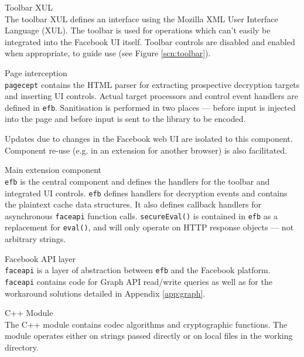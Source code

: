     \begin{sdesc}
     
    \item[Toolbar XUL] \hfill \\ The toolbar XUL defines an interface using the Mozilla XML User Interface Language (XUL). The toolbar is used for operations which can't easily be integrated into the Facebook UI itself. Toolbar controls are disabled and enabled when appropriate, to guide use (see Figure \ref{scn:toolbar}).
    
    \item[Page interception] \hfill \\ {\tt pagecept} contains the HTML parser for extracting prospective decryption targets and inserting UI controls. Actual target processors and control event handlers are defined in {\tt efb}. Sanitisation is performed in two places --- before input is injected into the page and before input is sent to the library to be encoded.
    
    Updates due to changes in the Facebook web UI are isolated to this component. Component re-use (e.g. in an extension for another browser) is also facilitated. 

    \item[Main extension component] \hfill \\ {\tt efb} is the central component and defines the handlers for the toolbar and integrated UI controls. {\tt efb} defines handlers for decryption events and contains the plaintext cache data structures. It also defines callback handlers for asynchronous {\tt faceapi} function calls. {\tt secureEval()} is contained in {\tt efb} as a replacement for {\tt eval()}, and will only operate on HTTP response objects --- not arbitrary strings.
    
    \item[Facebook API layer] \hfill \\ {\tt faceapi} is a layer of abstraction between {\tt efb} and the Facebook platform. {\tt faceapi} contains code for Graph API read/write queries as well as for the workaround solutions detailed in Appendix \ref{app:graph}.

    \item[C++ Module] \hfill \\ The C++ module contains codec algorithms and cryptographic functions. The module operates either on strings passed directly or on local files in the working directory.
    
    \end{sdesc}
    

